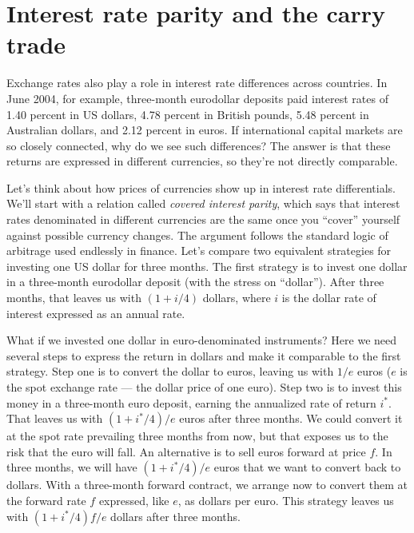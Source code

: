 \section{Interest rate parity and the carry trade }


Exchange rates also play a role in interest rate differences across
countries. In June 2004, for example, three-month eurodollar deposits
paid interest rates of 1.40 percent in US dollars, 4.78 percent in British
pounds, 5.48 percent in Australian dollars, and 2.12 percent in euros. If
international capital markets are so closely connected, why do we see
such differences?  The answer is that these returns are
expressed in different currencies, so they're not directly comparable.

Let's think about how prices of currencies show up in interest rate
differentials. We'll start with a relation called {\em covered
interest parity},  
which says that interest rates denominated in
different currencies are the same once you ``cover'' yourself
against possible currency changes.  The argument follows the
standard logic of arbitrage used endlessly in finance.  Let's
compare two equivalent strategies for investing one US dollar for three
months. The first strategy is to invest one dollar in a three-month
eurodollar deposit (with the stress on ``dollar''). After three
months, that leaves us with $(1+i/4)$  dollars, where $i$ is the
dollar rate of interest expressed as an annual rate.

What if we invested one dollar in euro-denominated instruments? Here
we need several steps to express the return in dollars and make it
comparable to the first strategy. Step one is to convert the dollar
to euros, leaving us with $1/e$ euros
($e$ is the spot exchange rate --- the dollar price of one euro).
Step two is to invest this money
in a three-month euro deposit, earning the annualized rate of return
$i^{*}$. That leaves us with $(1+i^{*}/4)/e$ euros after three
months. We could convert it at the spot rate prevailing three months
from now, but that exposes us to the risk that the euro will fall.
An alternative is to sell euros forward at price $f$. In three
months, we will have $(1+i^{*}/4)/e$ euros that we want to convert
back to dollars. With a three-month forward contract, we arrange now
to convert them at the forward rate $f$ expressed, like $e$, as
dollars per euro. This strategy leaves us with $(1+i^{*}/4)f/e$
dollars after three months.

